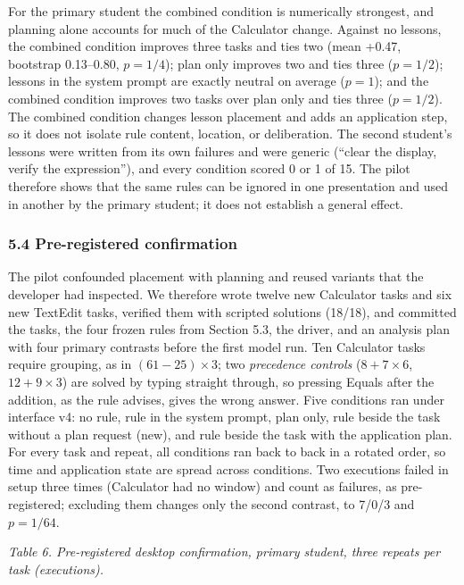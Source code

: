 \documentclass[
  10pt,
]{article}
\begin{document}
For the primary student the combined condition is numerically strongest,
and planning alone accounts for much of the Calculator change. Against
no lessons, the combined condition improves three tasks and ties two
(mean +0.47, bootstrap 0.13--0.80, \(p=1/4\)); plan only improves two
and ties three (\(p=1/2\)); lessons in the system prompt are exactly
neutral on average (\(p=1\)); and the combined condition improves two
tasks over plan only and ties three (\(p=1/2\)). The combined condition
changes lesson placement and adds an application step, so it does not
isolate rule content, location, or deliberation. The second student's
lessons were written from its own failures and were generic (``clear the
display, verify the expression''), and every condition scored 0 or 1 of
15. The pilot therefore shows that the same rules can be ignored in one
presentation and used in another by the primary student; it does not
establish a general effect.

\subsubsection{5.4 Pre-registered
confirmation}\label{pre-registered-confirmation}

The pilot confounded placement with planning and reused variants that
the developer had inspected. We therefore wrote twelve new Calculator
tasks and six new TextEdit tasks, verified them with scripted solutions
(18/18), and committed the tasks, the four frozen rules from Section
5.3, the driver, and an analysis plan with four primary contrasts before
the first model run. Ten Calculator tasks require grouping, as in
\((61-25)\times 3\); two \emph{precedence controls} (\(8+7\times 6\),
\(12+9\times 3\)) are solved by typing straight through, so pressing
Equals after the addition, as the rule advises, gives the wrong answer.
Five conditions ran under interface v4: no rule, rule in the system
prompt, plan only, rule beside the task without a plan request (new),
and rule beside the task with the application plan. For every task and
repeat, all conditions ran back to back in a rotated order, so time and
application state are spread across conditions. Two executions failed in
setup three times (Calculator had no window) and count as failures, as
pre-registered; excluding them changes only the second contrast, to
7/0/3 and \(p=1/64\).

\emph{Table 6. Pre-registered desktop confirmation, primary student,
three repeats per task (executions).}
\end{document}
